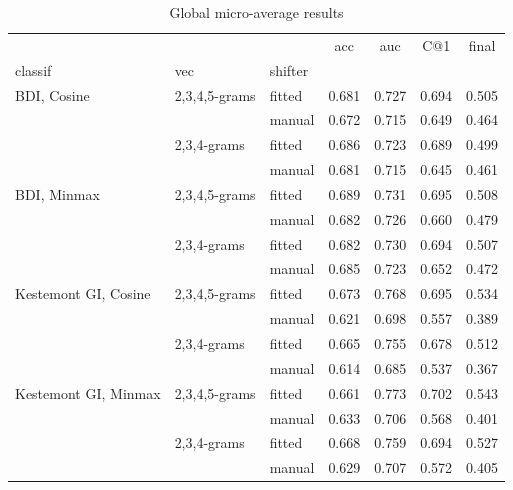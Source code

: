 \documentclass[
    hf
]{ceurart}
\begin{document}
\begin{table}
    \caption{Global micro-average results}
    \label{tab:micro}
    \raggedright
    \begin{tabular}{lllcccc}
        \toprule
                             &               &         & acc   & auc   & C@1   & final \\
        classif              & vec           & shifter &       &       &       &       \\
        \midrule
        BDI, Cosine          & 2,3,4,5-grams & fitted  & 0.681 & 0.727 & 0.694 & 0.505 \\
                             &               & manual  & 0.672 & 0.715 & 0.649 & 0.464 \\
                             & 2,3,4-grams   & fitted  & 0.686 & 0.723 & 0.689 & 0.499 \\
                             &               & manual  & 0.681 & 0.715 & 0.645 & 0.461 \\
        BDI, Minmax          & 2,3,4,5-grams & fitted  & 0.689 & 0.731 & 0.695 & 0.508 \\
                             &               & manual  & 0.682 & 0.726 & 0.660 & 0.479 \\
                             & 2,3,4-grams   & fitted  & 0.682 & 0.730 & 0.694 & 0.507 \\
                             &               & manual  & 0.685 & 0.723 & 0.652 & 0.472 \\
        Kestemont GI, Cosine & 2,3,4,5-grams & fitted  & 0.673 & 0.768 & 0.695 & 0.534 \\
                             &               & manual  & 0.621 & 0.698 & 0.557 & 0.389 \\
                             & 2,3,4-grams   & fitted  & 0.665 & 0.755 & 0.678 & 0.512 \\
                             &               & manual  & 0.614 & 0.685 & 0.537 & 0.367 \\
        Kestemont GI, Minmax & 2,3,4,5-grams & fitted  & 0.661 & 0.773 & 0.702 & 0.543 \\
                             &               & manual  & 0.633 & 0.706 & 0.568 & 0.401 \\
                             & 2,3,4-grams   & fitted  & 0.668 & 0.759 & 0.694 & 0.527 \\
                             &               & manual  & 0.629 & 0.707 & 0.572 & 0.405 \\
        \bottomrule
    \end{tabular}
\end{table}
\end{document}
